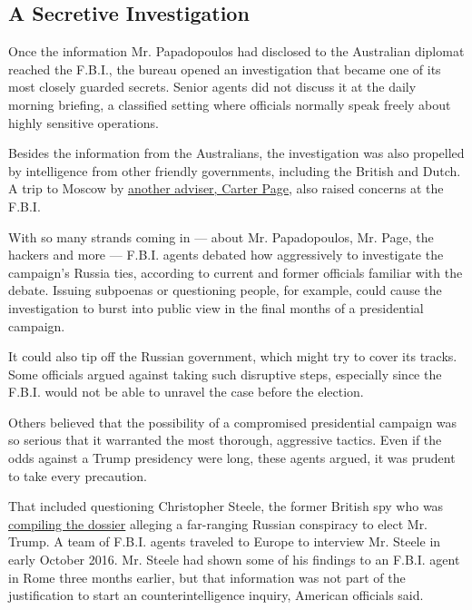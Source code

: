 \hypertarget{a-secretive-investigation}{%
\subsection{A Secretive Investigation}\label{a-secretive-investigation}}

Once the information Mr. Papadopoulos had disclosed to the Australian
diplomat reached the F.B.I., the bureau opened an investigation that
became one of its most closely guarded secrets. Senior agents did not
discuss it at the daily morning briefing, a classified setting where
officials normally speak freely about highly sensitive operations.

Besides the information from the Australians, the investigation was also
propelled by intelligence from other friendly governments, including the
British and Dutch. A trip to Moscow by
\href{https://www.nytimes.com/2017/12/18/magazine/what-if-anything-does-carter-page-know.html}{another
adviser, Carter Page}, also raised concerns at the F.B.I.

With so many strands coming in --- about Mr. Papadopoulos, Mr. Page, the
hackers and more --- F.B.I. agents debated how aggressively to
investigate the campaign's Russia ties, according to current and former
officials familiar with the debate. Issuing subpoenas or questioning
people, for example, could cause the investigation to burst into public
view in the final months of a presidential campaign.

It could also tip off the Russian government, which might try to cover
its tracks. Some officials argued against taking such disruptive steps,
especially since the F.B.I. would not be able to unravel the case before
the election.

Others believed that the possibility of a compromised presidential
campaign was so serious that it warranted the most thorough, aggressive
tactics. Even if the odds against a Trump presidency were long, these
agents argued, it was prudent to take every precaution.

That included questioning Christopher Steele, the former British spy who
was
\href{https://www.nytimes.com/2017/01/11/us/politics/donald-trump-russia-intelligence.html}{compiling
the dossier} alleging a far-ranging Russian conspiracy to elect Mr.
Trump. A team of F.B.I. agents traveled to Europe to interview Mr.
Steele in early October 2016. Mr. Steele had shown some of his findings
to an F.B.I. agent in Rome three months earlier, but that information
was not part of the justification to start an counterintelligence
inquiry, American officials said.

